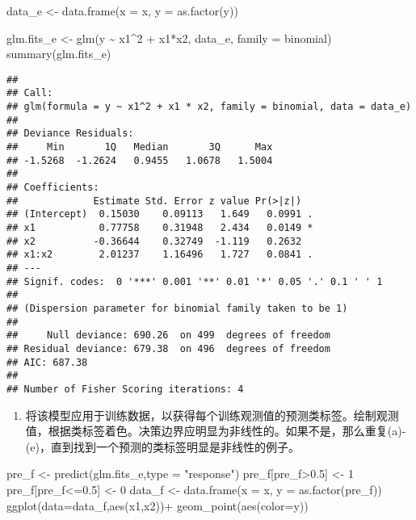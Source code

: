 \documentclass[
]{article}
\newenvironment{Shaded}{\begin{snugshade}}{\end{snugshade}}
\newcommand{\AttributeTok}[1]{\textcolor[rgb]{0.77,0.63,0.00}{#1}}
\newcommand{\DecValTok}[1]{\textcolor[rgb]{0.00,0.00,0.81}{#1}}
\newcommand{\FloatTok}[1]{\textcolor[rgb]{0.00,0.00,0.81}{#1}}
\newcommand{\FunctionTok}[1]{\textcolor[rgb]{0.00,0.00,0.00}{#1}}
\newcommand{\NormalTok}[1]{#1}
\newcommand{\OtherTok}[1]{\textcolor[rgb]{0.56,0.35,0.01}{#1}}
\newcommand{\SpecialCharTok}[1]{\textcolor[rgb]{0.00,0.00,0.00}{#1}}
\newcommand{\StringTok}[1]{\textcolor[rgb]{0.31,0.60,0.02}{#1}}
\providecommand{\tightlist}{%
  \setlength{\itemsep}{0pt}\setlength{\parskip}{0pt}}
\begin{document}
\begin{Shaded}
\begin{Highlighting}[]
\NormalTok{data\_e }\OtherTok{\textless{}{-}} \FunctionTok{data.frame}\NormalTok{(}\AttributeTok{x =}\NormalTok{ x, }\AttributeTok{y =} \FunctionTok{as.factor}\NormalTok{(y))}

\NormalTok{glm.fits\_e }\OtherTok{\textless{}{-}} \FunctionTok{glm}\NormalTok{(y }\SpecialCharTok{\textasciitilde{}}\NormalTok{ x1}\SpecialCharTok{\^{}}\DecValTok{2} \SpecialCharTok{+}\NormalTok{ x1}\SpecialCharTok{*}\NormalTok{x2, data\_e, }\AttributeTok{family =}\NormalTok{ binomial)}
\FunctionTok{summary}\NormalTok{(glm.fits\_e)}
\end{Highlighting}
\end{Shaded}

\begin{verbatim}
## 
## Call:
## glm(formula = y ~ x1^2 + x1 * x2, family = binomial, data = data_e)
## 
## Deviance Residuals: 
##     Min       1Q   Median       3Q      Max  
## -1.5268  -1.2624   0.9455   1.0678   1.5004  
## 
## Coefficients:
##             Estimate Std. Error z value Pr(>|z|)  
## (Intercept)  0.15030    0.09113   1.649   0.0991 .
## x1           0.77758    0.31948   2.434   0.0149 *
## x2          -0.36644    0.32749  -1.119   0.2632  
## x1:x2        2.01237    1.16496   1.727   0.0841 .
## ---
## Signif. codes:  0 '***' 0.001 '**' 0.01 '*' 0.05 '.' 0.1 ' ' 1
## 
## (Dispersion parameter for binomial family taken to be 1)
## 
##     Null deviance: 690.26  on 499  degrees of freedom
## Residual deviance: 679.38  on 496  degrees of freedom
## AIC: 687.38
## 
## Number of Fisher Scoring iterations: 4
\end{verbatim}

\begin{enumerate}
\def\labelenumi{(\alph{enumi})}
\setcounter{enumi}{5}
\tightlist
\item
  将该模型应用于训练数据，以获得每个训练观测值的预测类标签。绘制观测值，根据类标签着色。决策边界应明显为非线性的。如果不是，那么重复(a)-(e)，直到找到一个预测的类标签明显是非线性的例子。
\end{enumerate}

\begin{Shaded}
\begin{Highlighting}[]
\NormalTok{pre\_f }\OtherTok{\textless{}{-}} \FunctionTok{predict}\NormalTok{(glm.fits\_e,}\AttributeTok{type =} \StringTok{"response"}\NormalTok{)}
\NormalTok{pre\_f[pre\_f}\SpecialCharTok{\textgreater{}}\FloatTok{0.5}\NormalTok{] }\OtherTok{\textless{}{-}} \DecValTok{1}
\NormalTok{pre\_f[pre\_f}\SpecialCharTok{\textless{}=}\FloatTok{0.5}\NormalTok{] }\OtherTok{\textless{}{-}} \DecValTok{0}
\NormalTok{data\_f }\OtherTok{\textless{}{-}} \FunctionTok{data.frame}\NormalTok{(}\AttributeTok{x =}\NormalTok{ x, }\AttributeTok{y =} \FunctionTok{as.factor}\NormalTok{(pre\_f))}
\FunctionTok{ggplot}\NormalTok{(}\AttributeTok{data=}\NormalTok{data\_f,}\FunctionTok{aes}\NormalTok{(x1,x2))}\SpecialCharTok{+}
  \FunctionTok{geom\_point}\NormalTok{(}\FunctionTok{aes}\NormalTok{(}\AttributeTok{color=}\NormalTok{y))}
\end{Highlighting}
\end{Shaded}
\end{document}
